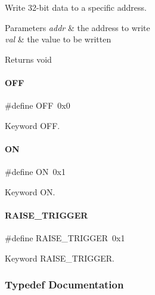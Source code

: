 Write 32-\/bit data to a specific address. 


\begin{DoxyParams}{Parameters}
{\em addr} & the address to write \\
\hline
{\em val} & the value to be written \\
\hline
\end{DoxyParams}
\begin{DoxyReturn}{Returns}
void 
\end{DoxyReturn}
\mbox{\label{a00020_a29e413f6725b2ba32d165ffaa35b01e5}} 
\paragraph{\texorpdfstring{O\+FF}{OFF}}
{\footnotesize\ttfamily \#define O\+FF~0x0}

Keyword O\+FF. \mbox{\label{a00020_ad76d1750a6cdeebd506bfcd6752554d2}} 
\paragraph{\texorpdfstring{ON}{ON}}
{\footnotesize\ttfamily \#define ON~0x1}

Keyword ON. \mbox{\label{a00020_abda90eda34a640b130f48a6ade23fe22}} 
\paragraph{\texorpdfstring{R\+A\+I\+S\+E\+\_\+\+T\+R\+I\+G\+G\+ER}{RAISE\_TRIGGER}}
{\footnotesize\ttfamily \#define R\+A\+I\+S\+E\+\_\+\+T\+R\+I\+G\+G\+ER~0x1}

Keyword R\+A\+I\+S\+E\+\_\+\+T\+R\+I\+G\+G\+ER. 

\subsubsection{Typedef Documentation}
\mbox{\label{a00020_a3d987633d7a3ca10c14905a807b62eb1}} 
